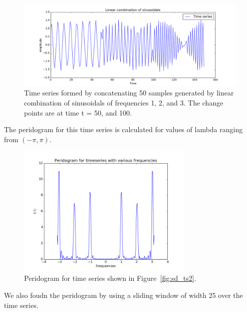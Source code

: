 \documentclass{article}
\begin{document}
\begin{figure}[ht!]
  \centering
  \includegraphics[width=1\textwidth]{images/spectral_density_2/ts2}
  \caption{Time series formed by concatenating 50 samples generated by linear combination of sinusoidals of frequencies 1, 2, and 3.  The change points are at time t = 50, and 100.\label{fig:sd2_ts2}}
\end{figure}

The peridogram for this time series is calculated for values of lambda ranging from $(-\pi, \pi)$.

\begin{figure}[ht!]
  \centering
  \includegraphics[width=0.75\textwidth]{images/spectral_density_2/peri2}
  \caption{Peridogram for time series shown in Figure~\ref{fig:sd_ts2}.\label{fig:sd2_peri2}}
\end{figure}

We also foudn the peridogram by using a sliding window of width 25 over the time series.



\end{document}
